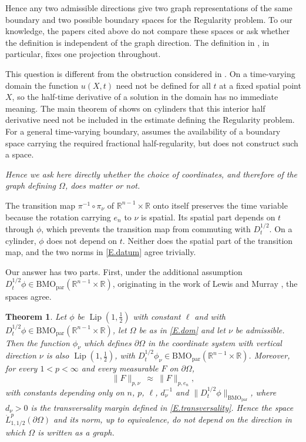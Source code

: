 \documentclass[12pt,leqno]{amsart}
\numberwithin{equation}{section}
\DeclareMathOperator{\Lip}{Lip}
\newcommand{\R}{\mathbb R}
\newcommand{\om}{\Omega}
\newcommand{\pom}{\partial\Omega}
\newcommand{\dhalf}{D_t^{1/2}}
\newcommand{\BMOpar}{\mathrm{BMO}_{\mathrm{par}}}
\theoremstyle{plain}
\newtheorem{theorem}[equation]{Theorem}
\theoremstyle{remark}
\begin{document}
\noindent Hence any two admissible directions give two graph representations
of the same boundary and two possible boundary spaces for the Regularity
problem. To our knowledge, the papers cited above do not compare these spaces
or ask whether the definition is independent of the graph direction. The
definition in
\cite[(20)--(22)]{Nys06}, in particular, fixes one projection throughout.\medskip

\noindent This question is different from the obstruction considered in
\cite[\S1]{Din}. On a time-varying domain the function $u(X,t)$ need not be
defined for all $t$ at a fixed spatial point $X$, so the half-time derivative
of a solution in the domain has no immediate meaning. The main theorem of
\cite{Din} shows on cylinders that this interior half derivative need not be
included in the estimate defining the Regularity problem. For a general
time-varying boundary, \cite[Definition 1.2]{Din} assumes the availability of
a boundary space carrying the required fractional half-regularity, but does
not construct such a space.\medskip

\emph{Hence we ask here directly whether the choice of coordinates, and therefore
of the graph defining $\om$, does matter or not.}\medskip

\noindent The transition map $\pi^{-1}\circ\pi_\nu$ of
$\R^{n-1}\times\R$ onto itself preserves the time variable because the
rotation carrying $e_n$ to $\nu$ is spatial. Its spatial part depends on $t$
through $\phi$, which prevents the transition map from commuting with
$\dhalf$. On a cylinder, $\phi$ does not depend on $t$. Neither does the
spatial part of the transition map, and the two norms in \eqref{E.datum} agree
trivially.\medskip

Our answer has two parts. First, under the additional assumption
$\dhalf\phi\in\BMOpar(\R^{n-1}\times\R)$, originating in the work of Lewis
and Murray \cite{LM}, the spaces agree.

\begin{theorem}\label{T.main}
Let $\phi$ be $\Lip(1,\tfrac12)$ with constant $\ell$ and with
$\dhalf\phi\in\BMOpar(\R^{n-1}\times\R)$, let $\om$ be as in \eqref{E.dom} and
let $\nu$ be admissible. Then the function $\phi_\nu$ which defines $\pom$ in
the coordinate system with vertical direction $\nu$ is also
$\Lip(1,\tfrac12)$, with
$\dhalf\phi_\nu\in\BMOpar(\R^{n-1}\times\R)$. Moreover, for every
$1<p<\infty$ and every measurable $F$ on $\pom$,
\begin{equation}\label{E.main}
  \|F\|_{p,\nu}\ \approx\ \|F\|_{p,e_n} ,
\end{equation}
with constants depending only on $n$, $p$, $\ell$, $d_\nu^{-1}$ and
$\|\dhalf\phi\|_{\BMOpar}$, where $d_\nu>0$ is the transversality margin
defined in \eqref{E.transversality}. Hence the space $\dot L^p_{1,1/2}(\pom)$ and its
norm, up to equivalence, do not depend on the direction in which $\om$ is
written as a graph.
\end{theorem}
\end{document}
